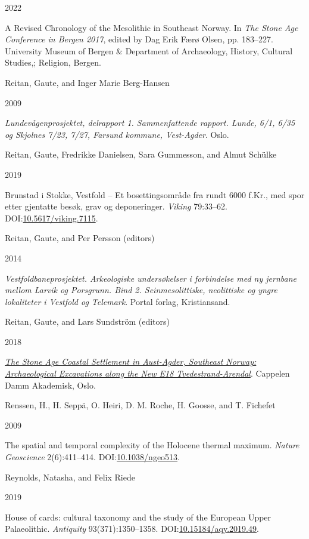\documentclass[
  12pt,
  a4paper,
  oneside]{book}
\newlength{\cslhangindent}
\newlength{\csllabelwidth}
\newlength{\cslentryspacingunit} %
\newenvironment{CSLReferences}[2] %
 {%
  \setlength{\parindent}{0pt}
  \ifodd #1
  \let\oldpar\par
  \def\par{\hangindent=\cslhangindent\oldpar}
  \fi
  \setlength{\parskip}{#2\cslentryspacingunit}
 }%
 {}
\newcommand{\CSLBlock}[1]{#1\hfill\break}
\newcommand{\CSLLeftMargin}[1]{\parbox[t]{\csllabelwidth}{#1}}
\newcommand{\CSLRightInline}[1]{\parbox[t]{\linewidth - \csllabelwidth}{#1}\break}
\begin{document}
\begin{CSLReferences}{0}{0}
\leavevmode{}%
\CSLLeftMargin{ 2022 }
\CSLRightInline{{A Revised Chronology of the Mesolithic in Southeast Norway}. In \emph{{The Stone Age Conference in Bergen 2017}}, edited by Dag Erik Færø Olsen, pp. 183--227. University Museum of Bergen \& Department of Archaeology, History, Cultural Studies,; Religion, Bergen.}

\leavevmode{}%
\CSLBlock{Reitan, Gaute, and Inger Marie Berg-Hansen}
\CSLLeftMargin{ 2009}
\CSLRightInline{\emph{{Lundevågenprosjektet, delrapport 1. Sammenfattende rapport. Lunde, 6/1, 6/35 og Skjolnes 7/23, 7/27, Farsund kommune, Vest-Agder}}. Oslo.}

\leavevmode{}%
\CSLBlock{Reitan, Gaute, Fredrikke Danielsen, Sara Gummesson, and Almut Schülke}
\CSLLeftMargin{ 2019}
\CSLRightInline{{Brunstad i Stokke, Vestfold -- Et bosettingsområde fra rundt 6000 f.Kr., med spor etter gjentatte besøk, grav og deponeringer}. \emph{Viking} 79:33--62. DOI:\href{https://doi.org/10.5617/viking.7115}{10.5617/viking.7115}.}

\leavevmode{}%
\CSLBlock{Reitan, Gaute, and Per Persson (editors)}
\CSLLeftMargin{ 2014}
\CSLRightInline{\emph{{Vestfoldbaneprosjektet. Arkeologiske undersøkelser i forbindelse med ny jernbane mellom Larvik og Porsgrunn. Bind 2. Seinmesolittiske, neolittiske og yngre lokaliteter i Vestfold og Telemark}}. Portal forlag, Kristiansand.}

\leavevmode{}%
\CSLBlock{Reitan, Gaute, and Lars Sundström (editors)}
\CSLLeftMargin{ 2018}
\CSLRightInline{\emph{\href{https://doi.org/10.23865/noasp.50}{{The Stone Age Coastal Settlement in Aust-Agder, Southeast Norway: Archaeological Excavations along the New E18 Tvedestrand-Arendal}}}. Cappelen Damm Akademisk, Oslo.}

\leavevmode{}%
\CSLBlock{Renssen, H., H. Seppä, O. Heiri, D. M. Roche, H. Goosse, and T. Fichefet}
\CSLLeftMargin{ 2009}
\CSLRightInline{{The spatial and temporal complexity of the Holocene thermal maximum}. \emph{Nature Geoscience} 2(6):411--414. DOI:\href{https://doi.org/10.1038/ngeo513}{10.1038/ngeo513}.}

\leavevmode{}%
\CSLBlock{Reynolds, Natasha, and Felix Riede}
\CSLLeftMargin{ 2019}
\CSLRightInline{{House of cards: cultural taxonomy and the study of the European Upper Palaeolithic}. \emph{Antiquity} 93(371):1350--1358. DOI:\href{https://doi.org/10.15184/aqy.2019.49}{10.15184/aqy.2019.49}.}


\end{CSLReferences}
\end{document}
